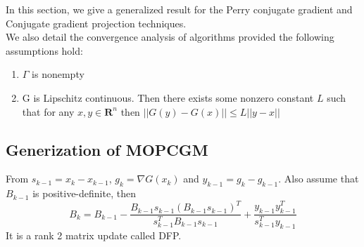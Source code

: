 \documentclass{article}
\theoremstyle{remark}
\begin{document}
{In this section, we give a generalized result for the Perry conjugate gradient and Conjugate gradient projection techniques. \\
We also detail the convergence analysis of algorithms  provided the following assumptions hold:
\begin{enumerate}
    \item[(A1)] $\Gamma$ is nonempty
    \item[(A2)] G is Lipschitz continuous. Then there exists some nonzero constant $L$ such that for any $x, y\in \mathbf{R}^n$ then $||G(y)-G(x)||\leq L||y-x||$
\end{enumerate}
\subsection{Generization of MOPCGM}
From $s_{k-1}=x_k-x_{k-1}$, $g_k=\nabla G(x_k)$ and $y_{k-1}=g_k-g_{k-1}$. Also assume that $B_{k-1}$ is positive-definite, then 
\[
B_k=B_{k-1}-\frac{B_{k-1}s_{k-1}(B_{k-1}s_{k-1})^T}{s_{k-1}^TB_{k-1}s_{k-1}}+\frac{y_{k-1}y_{k-1}^T}{s_{k-1}^Ty_{k-1}}
\]
It is a rank 2 matrix update called DFP.

}
\end{document}
